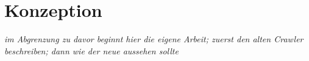 \section{Konzeption}

\textit{im Abgrenzung zu davor beginnt hier die eigene Arbeit; zuerst den alten Crawler beschreiben; dann wie der neue aussehen sollte}